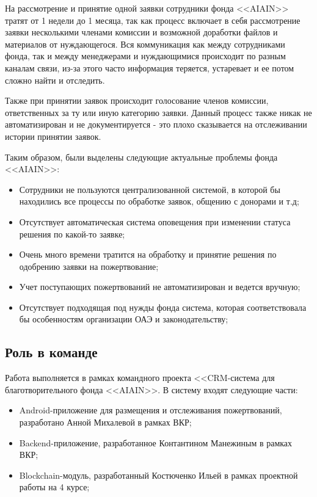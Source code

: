 \documentclass[a4paper,12pt,reqno]{article}
\begin{document}
На рассмотрение и принятие одной заявки сотрудники фонда <<AIAIN>> тратят от 1 недели до 1 месяца, так как процесс включает в себя рассмотрение заявки несколькими членами комиссии и возможной доработки файлов и материалов от нуждающегося. Вся коммуникация как между сотрудниками фонда, так и между менеджерами и нуждающимися происходит по разным каналам связи, из-за этого часто информация теряется, устаревает и ее потом сложно найти и отследить. 

Также при принятии заявок происходит голосование членов комиссии, ответственных за ту или иную категорию заявки. Данный процесс также никак не автоматизирован и не документируется - это плохо сказывается на отслеживании истории принятии заявок.

Таким образом, были выделены следующие актуальные проблемы фонда <<AIAIN>>:
\begin{itemize}
    \item Сотрудники не пользуются централизованной системой, в которой бы находились все процессы по обработке заявок, общению с донорами и т.д;
    \item Отсутствует автоматическая система оповещения при изменении статуса решения по какой-то заявке;
    \item Очень много времени тратится на обработку и принятие решения по одобрению заявки на пожертвование;
    \item Учет поступающих пожертвований не автоматизирован и ведется вручную;
    \item Отсутствует подходящая под нужды фонда система, которая соответствовала бы особенностям организации ОАЭ и законодательству;
\end{itemize}

\subsection{Роль в команде}

Работа выполняется в рамках командного проекта <<CRM-система для благотворительного фонда <<AIAIN>>. В систему входят следующие части:
\begin{itemize}
    \item Android-приложение для размещения и отслеживания пожертвований, разработано Анной Михалевой в рамках ВКР;
    \item Backend-приложение, разработанное Контантином Манежиным в рамках ВКР;
    \item Blockchain-модуль, разработанный Костюченко Ильей в рамках проектной работы на 4 курсе;
\end{itemize}
\end{document}
